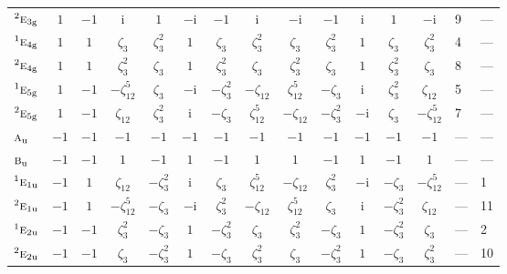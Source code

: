 \documentclass[10pt,a4paper]{article}
\numberwithin{equation}{section}
\newcommand{\irr}[1]{\text{\normalfont\scshape #1}}
\newcommand{\conjpair}[1]{{}^{#1}}
\newcommand{\ptag}[1]{\mathrm{#1}}
\newcommand{\iunit}{\mathrm{i}}
\newcommand{\rootunity}[1]{\zeta_{#1}}
\begin{document}
{\begin{longtable}{@{}lccccccccccccll@{}}
$\conjpair{2}\irr{e}_{3\ptag{g}}$ & $1$ & $-1$ & $\iunit{}$ & $1$ & $-\iunit{}$ & $-1$ & $\iunit{}$ & $-\iunit{}$ & $-1$ & $\iunit{}$ & $1$ & $-\iunit{}$ & 9 & ---\\
$\conjpair{1}\irr{e}_{4\ptag{g}}$ & $1$ & $1$ & $\rootunity{3}$ & $\rootunity{3}^{2}$ & $1$ & $\rootunity{3}$ & $\rootunity{3}^{2}$ & $\rootunity{3}$ & $\rootunity{3}^{2}$ & $1$ & $\rootunity{3}$ & $\rootunity{3}^{2}$ & 4 & ---\\
$\conjpair{2}\irr{e}_{4\ptag{g}}$ & $1$ & $1$ & $\rootunity{3}^{2}$ & $\rootunity{3}$ & $1$ & $\rootunity{3}^{2}$ & $\rootunity{3}$ & $\rootunity{3}^{2}$ & $\rootunity{3}$ & $1$ & $\rootunity{3}^{2}$ & $\rootunity{3}$ & 8 & ---\\
$\conjpair{1}\irr{e}_{5\ptag{g}}$ & $1$ & $-1$ & $-\rootunity{12}^{5}$ & $\rootunity{3}$ & $-\iunit{}$ & $-\rootunity{3}^{2}$ & $-\rootunity{12}$ & $\rootunity{12}^{5}$ & $-\rootunity{3}$ & $\iunit{}$ & $\rootunity{3}^{2}$ & $\rootunity{12}$ & 5 & ---\\
$\conjpair{2}\irr{e}_{5\ptag{g}}$ & $1$ & $-1$ & $\rootunity{12}$ & $\rootunity{3}^{2}$ & $\iunit{}$ & $-\rootunity{3}$ & $\rootunity{12}^{5}$ & $-\rootunity{12}$ & $-\rootunity{3}^{2}$ & $-\iunit{}$ & $\rootunity{3}$ & $-\rootunity{12}^{5}$ & 7 & ---\\
$\irr{a}_{\ptag{u}}$ & $-1$ & $-1$ & $-1$ & $-1$ & $-1$ & $-1$ & $-1$ & $-1$ & $-1$ & $-1$ & $-1$ & $-1$ & --- & ---\\
$\irr{b}_{\ptag{u}}$ & $-1$ & $-1$ & $1$ & $-1$ & $1$ & $-1$ & $1$ & $1$ & $-1$ & $1$ & $-1$ & $1$ & --- & ---\\
$\conjpair{1}\irr{e}_{1\ptag{u}}$ & $-1$ & $1$ & $\rootunity{12}$ & $-\rootunity{3}^{2}$ & $\iunit{}$ & $\rootunity{3}$ & $\rootunity{12}^{5}$ & $-\rootunity{12}$ & $\rootunity{3}^{2}$ & $-\iunit{}$ & $-\rootunity{3}$ & $-\rootunity{12}^{5}$ & --- & 1\\
$\conjpair{2}\irr{e}_{1\ptag{u}}$ & $-1$ & $1$ & $-\rootunity{12}^{5}$ & $-\rootunity{3}$ & $-\iunit{}$ & $\rootunity{3}^{2}$ & $-\rootunity{12}$ & $\rootunity{12}^{5}$ & $\rootunity{3}$ & $\iunit{}$ & $-\rootunity{3}^{2}$ & $\rootunity{12}$ & --- & 11\\
$\conjpair{1}\irr{e}_{2\ptag{u}}$ & $-1$ & $-1$ & $\rootunity{3}^{2}$ & $-\rootunity{3}$ & $1$ & $-\rootunity{3}^{2}$ & $\rootunity{3}$ & $\rootunity{3}^{2}$ & $-\rootunity{3}$ & $1$ & $-\rootunity{3}^{2}$ & $\rootunity{3}$ & --- & 2\\
$\conjpair{2}\irr{e}_{2\ptag{u}}$ & $-1$ & $-1$ & $\rootunity{3}$ & $-\rootunity{3}^{2}$ & $1$ & $-\rootunity{3}$ & $\rootunity{3}^{2}$ & $\rootunity{3}$ & $-\rootunity{3}^{2}$ & $1$ & $-\rootunity{3}$ & $\rootunity{3}^{2}$ & --- & 10\\

\end{longtable}}
\end{document}
